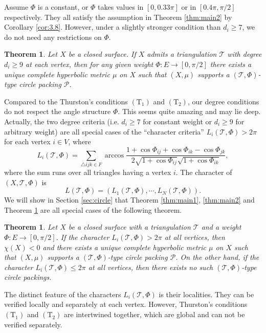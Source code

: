 \documentclass[12pt]{amsart}
\numberwithin{equation}{section}
\newtheorem{theo}[prop]{Theorem}
\begin{document}
Assume $\Phi$ is a constant, or $\Phi$ takes values in $[0, 0.33\pi]$ or in $[0.4\pi, \pi/2]$ respectively. They all satisfy the
assumption in Theorem \ref{thm:main2} by Corollary \ref{cor:3.8}. However, under a slightly stronger condition than $d_i \geq 7$,
we do not need any restrictions on $\Phi$.

\begin{theo}\label{thm:main3}
Let $X$ be a closed surface. If $X$ admits a triangulation $\mathcal{T}$ with degree $d_i \geq 9$ at each
vertex, then for any given weight $\Phi: E \to [0,\pi/2]$ there exists a unique complete hyperbolic metric $\mu$ on
$X$ such that $(X,\mu)$ supports a $(\mathcal{T},\Phi)$-type circle packing $\mathcal{P}$.
\end{theo}

Compared to the Thurston's conditions $(\mathrm{T}_1)$ and $(\mathrm{T}_2)$, our degree conditions do not respect the angle
structure $\Phi$. This seems quite amazing and may lie deep. Actually, the two degree criteria (i.e. $d_i \geq 7$ for
constant weight or $d_i \geq 9$ for arbitrary weight) are all special cases of the ``character criteria'' $L_i(\mathcal{T},\Phi) >
2\pi$ for each vertex $i \in V$, where
\begin{equation}\label{eq:character}
L_i(\mathcal{T},\Phi) = \sum_{\triangle ijk \in F} \arccos \frac{1 + \cos\Phi_{ij} + \cos\Phi_{ik} - \cos\Phi_{jk}}{2\sqrt{1 + \cos\Phi_{ij}}\sqrt{1 + \cos\Phi_{ik}}},
\end{equation}
where the sum runs over all triangles having a vertex $i$. The character of $(X,\mathcal{T},\Phi)$ is
\[
L(\mathcal{T},\Phi) = (L_1(\mathcal{T},\Phi), \cdots, L_N(\mathcal{T},\Phi)).
\]
We will show in Section \ref{sec:circle} that Theorem \ref{thm:main1},
\ref{thm:main2} and Theorem \ref{thm:main3} are all special cases of the following theorem.

\begin{theo}\label{thm:main4}
Let $X$ be a closed surface with a triangulation $\mathcal{T}$ and a weight $\Phi : E \to [0,\pi/2]$. If
the character $L_i(\mathcal{T},\Phi) > 2\pi$ at all vertices, then $\chi(X) < 0$ and there exists a unique complete hyperbolic
metric $\mu$ on $X$ such that $(X,\mu)$ supports a $(\mathcal{T},\Phi)$-type circle packing $\mathcal{P}$. On the other hand, if the
character $L_i(\mathcal{T},\Phi) \leq 2\pi$ at all vertices, then there exists no such $(\mathcal{T},\Phi)$-type circle packings.
\end{theo}

The distinct feature of the characters $L_i(\mathcal{T},\Phi)$ is their localities. They can be verified locally and
separately at each vertex. However, Thurston's conditions $(\mathrm{T}_1)$ and $(\mathrm{T}_2)$ are intertwined together, which
are global and can not be verified separately.
\end{document}
